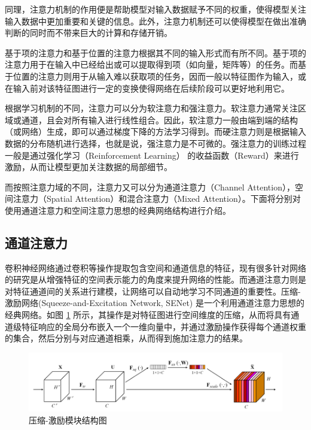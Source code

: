 同理，注意力机制的作用便是帮助模型对输入数据赋予不同的权重，使得模型关注输入数据中更加重要和关键的信息。此外，注意力机制还可以使得模型在做出准确判断的同时而不带来巨大的计算和存储开销。

基于项的注意力和基于位置的注意力根据其不同的输入形式而有所不同。基于项的注意力用于在输入中已经给出或可以提取得到项（如向量，矩阵等）的任务。而基于位置的注意力则用于从输入难以获取项的任务，因而一般以特征图作为输入，或在输入前对该特征图进行一定的变换使得网络在后续阶段可以更好地利用它。

根据学习机制的不同，注意力可以分为软注意力和强注意力。软注意力通常关注区域或通道，且会对所有输入进行线性组合。因此，软注意力一般由端到端的结构（或网络）生成，即可以通过梯度下降的方法学习得到。而硬注意力则是根据输入数据的分布随机进行选择，也就是说，强注意力是不可微的。强注意力的训练过程一般是通过强化学习（Reinforcement Learning） 的收益函数（Reward）来进行激励，从而让模型更加关注数据的局部细节。

而按照注意力域的不同，注意力又可以分为通道注意力（Channel Attention），空间注意力（Spatial Attention）和混合注意力（Mixed Attention）。下面将分别对使用通道注意力和空间注意力思想的经典网络结构进行介绍。

\newpage

\subsection{通道注意力}

卷积神经网络通过卷积等操作提取包含空间和通道信息的特征，现有很多针对网络的研究是从增强特征的空间表示能力的角度来提升网络的性能。而通道注意力则是对特征通道间的关系进行建模，让网络可以自动地学习不同通道的重要性。压缩-激励网络(Squeeze-and-Excitation Network, SENet) \cite{DBLP:conf/cvpr/HuSS18} 是一个利用通道注意力思想的经典网络。如图 \ref{fig:fig2-11} 所示，其操作是对特征图进行空间维度的压缩，从而将具有通道级特征响应的全局分布嵌入一个一维向量中，并通过激励操作获得每个通道权重的集合，然后分别与对应通道相乘，从而得到施加注意力的结果。

\begin{figure}[!htbp]
	\centering
	\includegraphics{figures/12.png}
	\caption{压缩-激励模块结构图}
	\label{fig:fig2-11}
	\vspace{-0.8cm}  %
\end{figure}

